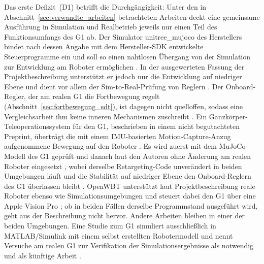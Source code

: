 Das erste Defizit~(D1) betrifft die Durchgängigkeit: Unter den in Abschnitt~\ref{sec:verwandte_arbeiten} betrachteten Arbeiten deckt eine gemeinsame Ausführung in Simulation und Realbetrieb jeweils nur einen Teil des Funktionsumfangs des G1 ab.
Der Simulator unitree\_mujoco des Herstellers bindet nach dessen Angabe mit dem Hersteller-SDK entwickelte Steuerprogramme ein und soll so einen nahtlosen Übergang von der Simulation zur Entwicklung am Roboter ermöglichen \cite{UnitreeMujoco}.
In der ausgewerteten Fassung der Projektbeschreibung unterstützt er jedoch nur die Entwicklung auf niedriger Ebene und dient vor allem der Sim-to-Real-Prüfung von Reglern \cite{UnitreeMujoco}.
Der Onboard-Regler, der am realen G1 die Fortbewegung regelt (Abschnitt~\ref{sec:fortbewegung_sdt}), ist dagegen nicht quelloffen, sodass eine Vergleichsarbeit ihm keine inneren Mechanismen zuschreibt \cite{Hu2026}.
Ein Ganzkörper-Teleoperationssystem für den G1, beschrieben in einem nicht begutachteten Preprint, überträgt die mit einem IMU-basierten Motion-Capture-Anzug aufgenommene Bewegung auf den Roboter \cite{Durrani2026}.
Es wird zuerst mit dem MuJoCo-Modell des G1 geprüft und danach laut den Autoren ohne Änderung am realen Roboter eingesetzt \cite{Durrani2026}, wobei derselbe Retargeting-Code unverändert in beiden Umgebungen läuft \cite{Durrani2026} und die Stabilität auf niedriger Ebene den Onboard-Reglern des G1 überlassen bleibt \cite{Durrani2026}.
OpenWBT unterstützt laut Projektbeschreibung reale Roboter ebenso wie Simulationsumgebungen und steuert dabei den G1 über eine Apple Vision Pro \cite{GalbotOpenWBT}; ob in beiden Fällen derselbe Programmstand ausgeführt wird, geht aus der Beschreibung nicht hervor.
Andere Arbeiten bleiben in einer der beiden Umgebungen.
Eine Studie zum G1 simuliert ausschließlich in MATLAB/Simulink mit einem selbst erstellten Robotermodell \cite{Yu2026} und nennt Versuche am realen G1 zur Verifikation der Simulationsergebnisse als notwendig \cite{Yu2026} und als künftige Arbeit \cite{Yu2026}.
